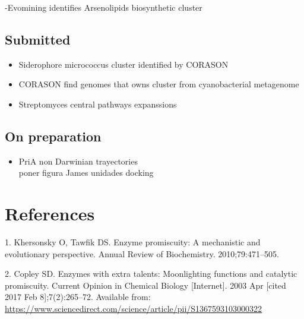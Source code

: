 \documentclass[12pt,twoside]{reedthesis}
\providecommand{\tightlist}{%
  \setlength{\itemsep}{0pt}\setlength{\parskip}{0pt}}
\begin{document}
  -Evomining identifies Arsenolipids biosynthetic cluster
  
  \section{Submitted}\label{submitted}
  
  \begin{itemize}
  \tightlist
  \item
    Siderophore micrococcus cluster identified by CORASON\\
  \item
    CORASON find genomes that owns cluster from cyanobacterial
    metagenome\\
  \item
    Streptomyces central pathways expanssions
  \end{itemize}
  
  \section{On preparation}\label{on-preparation}
  
  \begin{itemize}
  \tightlist
  \item
    PriA non Darwinian trayectories\\
    poner figura James unidades docking
  \end{itemize}
  
  \backmatter
  
  \chapter{References}\label{references}
  
  \noindent
  
  \setlength{\parindent}{-0.20in} \setlength{\leftskip}{0.20in}
  \setlength{\parskip}{8pt}
  
  \hypertarget{refs}{}
  \hypertarget{ref-khersonsky_enzyme_2010}{}
  1. Khersonsky O, Tawfik DS. Enzyme promiscuity: A mechanistic and
  evolutionary perspective. Annual Review of Biochemistry.
  2010;79:471--505.
  
  \hypertarget{ref-copley_enzymes_2003}{}
  2. Copley SD. Enzymes with extra talents: Moonlighting functions and
  catalytic promiscuity. Current Opinion in Chemical Biology
  {[}Internet{]}. 2003 Apr {[}cited 2017 Feb 8{]};7(2):265--72. Available
  from:
  \url{https://www.sciencedirect.com/science/article/pii/S1367593103000322}
  
\end{document}
